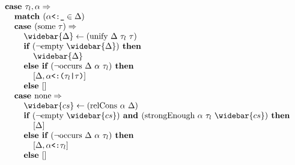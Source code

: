 \documentclass[acmsmall]{acmart}
\begin{document}
\begin{figure*}[h]
\[\begin{array}[t]{@{} l}
\end{array}
\begin{array}[t]{@{} l}
    \I \B{case } \tau_l, \alpha \Rightarrow 
    \\
    \I\I \B{match } (\code{$\alpha$<:\_} \in \Delta)
    \\
    \I\I \B{case } (\F{some } \tau) \Rightarrow
    \\
    \I\I\I \widebar{\Delta} \leftarrow (\F{unify } \Delta\ \tau_l\ \tau)
    \\
    \I\I\I \B{if } (\neg \F{empty } \widebar{\Delta}) \B{ then }
    \\
    \I\I\I\I \widebar{\Delta}
    \\
    \I\I\I \B{else if } (\neg \F{occurs } \Delta\ \alpha\ \tau_l) \B{ then }
    \\
    \I\I\I\I [\Delta,\code{$\alpha$<:($\tau_l$|$\tau$)}] 
    \\
    \I\I\I \B{else } [] 
    \\
    \I\I \B{case } \F{none} \Rightarrow
    \\
    \I\I\I \widebar{cs} \leftarrow (\F{relCons } \alpha\ \Delta)  
    \\
    \I\I\I \B{if } (\neg \F{empty } \widebar{cs}) \B{ and } 
    (\F{strongEnough } \alpha\ \tau_l\ \widebar{cs}) \B{ then }
    \\
    \I\I\I\I [\Delta]
    \\
    \I\I\I \B{else if } (\neg \F{occurs } \Delta\ \alpha\ \tau_l) \B{ then }
    \\
    \I\I\I\I [\Delta,\code{$\alpha$<:$\tau_l$}] 
    \\
    \I\I\I \B{else } []

    \\


\end{array}\]
\end{figure*}
\end{document}
